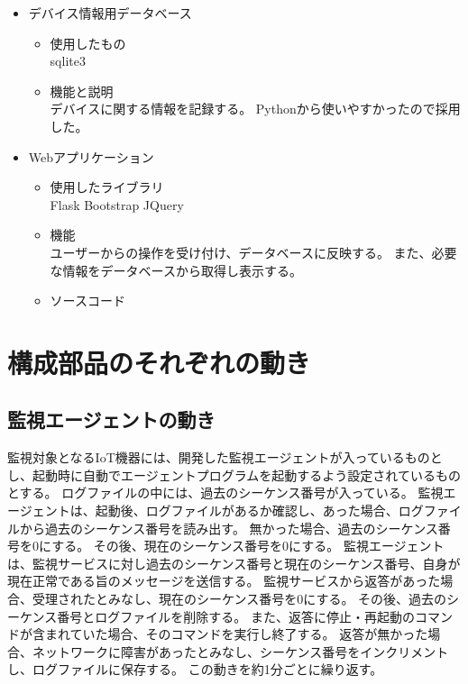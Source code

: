 \begin{itemize}
\begin{itemize}
\begin{itemize}
					\item デバイス情報用データベース
						\begin{itemize}
							\item 使用したもの\\
								sqlite3
							\item 機能と説明\\
								デバイスに関する情報を記録する。
								Pythonから使いやすかったので採用した。
						\end{itemize}
					\item Webアプリケーション
						\begin{itemize}
							\item 使用したライブラリ\\
								Flask Bootstrap JQuery
							\item 機能\\
								ユーザーからの操作を受け付け、データベースに反映する。
								また、必要な情報をデータベースから取得し表示する。
							\item ソースコード\\
						\end{itemize}
				\end{itemize}
		\end{itemize}
\end{itemize}
\section{構成部品のそれぞれの動き}

\subsection{監視エージェントの動き}
監視対象となるIoT機器には、開発した監視エージェントが入っているものとし、起動時に自動でエージェントプログラムを起動するよう設定されているものとする。
ログファイルの中には、過去のシーケンス番号が入っている。
監視エージェントは、起動後、ログファイルがあるか確認し、あった場合、ログファイルから過去のシーケンス番号を読み出す。
無かった場合、過去のシーケンス番号を0にする。
その後、現在のシーケンス番号を0にする。
監視エージェントは、監視サービスに対し過去のシーケンス番号と現在のシーケンス番号、自身が現在正常である旨のメッセージを送信する。
監視サービスから返答があった場合、受理されたとみなし、現在のシーケンス番号を0にする。
その後、過去のシーケンス番号とログファイルを削除する。
また、返答に停止・再起動のコマンドが含まれていた場合、そのコマンドを実行し終了する。
返答が無かった場合、ネットワークに障害があったとみなし、シーケンス番号をインクリメントし、ログファイルに保存する。
この動きを約1分ごとに繰り返す。

